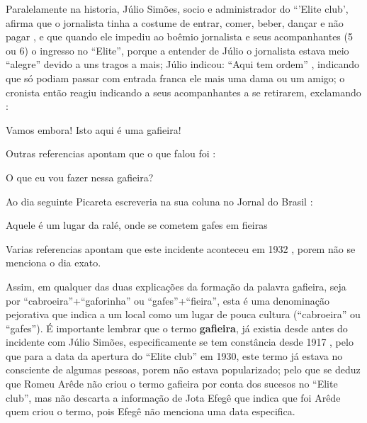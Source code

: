 Paralelamente na historia, Júlio Simões, socio e administrador do ``'Elite club', afirma que o jornalista tinha a costume de entrar, 
comer, beber, dançar e não pagar \cite[pp.13 ]{respeitojournalbrasil1},
e que quando ele impediu ao boêmio jornalista e seus acompanhantes (5 ou 6) o ingresso no ``Elite'', 
porque a entender de Júlio o jornalista estava meio ``alegre'' devido a uns tragos a mais;
 Júlio indicou: ``Aqui tem ordem'' 
\cite[pp. 29]{instituto1987revista} \cite[pp.13 ]{respeitojournalbrasil1} \cite[pp. 6]{gafieiraaredeout2} \cite[pp. 3 - Encontro]{gafieiraaredeout1},
indicando que só podiam passar com entrada franca ele mais uma dama ou um amigo;
o cronista então reagiu indicando a seus acompanhantes a se retirarem, 
exclamando \cite[pp. 29]{instituto1987revista} \cite[pp. 6 - Tribuna Bis]{gafieiraaredeout3}: 
\begin{citando}
Vamos embora! Isto aqui é uma gafieira!
\end{citando}
Outras referencias apontam que o que falou foi \cite[pp. 6]{gafieiraaredeout2} \cite[pp. 3 - Encontro]{gafieiraaredeout1}:
\begin{citando}
O que eu vou fazer nessa gafieira?
\end{citando}
Ao dia seguinte Picareta escreveria na sua coluna no Jornal do Brasil \cite[pp. 188]{raca1999}:
\begin{citando}
Aquele é um lugar da ralé, onde se cometem gafes em fieiras
\end{citando}
Varias referencias apontam que este incidente aconteceu em 1932 \cite[pp. 3 - Encontro]{gafieiraaredeout1} \cite[pp. 188]{raca1999}, 
porem não se menciona o dia exato. 




Assim, em qualquer das duas explicações da formação da palavra gafieira,
seja por ``cabroeira''+``gaforinha'' ou ``gafes''+``fieira'',
esta é uma denominação pejorativa que indica a um local 
como um lugar de pouca cultura (``cabroeira'' ou ``gafes'').
É importante lembrar que o termo \textbf{gafieira}, já existia desde antes do 
incidente com Júlio Simões, especificamente se tem constância desde 1917 \cite[pp. 4]{oldgafieira1},
pelo que para a data da apertura do ``Elite club'' em 1930,
este termo já estava no consciente de algumas pessoas, porem não estava popularizado;
pelo que se deduz que Romeu Arêde não criou o termo gafieira por conta dos sucesos no ``Elite club'',
mas não descarta a informação de Jota Efegê que indica que foi Arêde quem criou o termo,
pois  Efegê não menciona uma data especifica.

